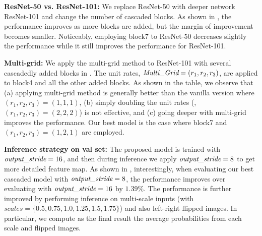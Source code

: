 \textbf{ResNet-50 vs. ResNet-101:} We replace ResNet-50 with deeper network ResNet-101 and change the number of cascaded blocks. As shown in , the performance improves as more blocks are added, but the margin of improvement becomes smaller. Noticeably, employing block7 to ResNet-50 decreases slightly the performance while it still improves the performance for ResNet-101.

\textbf{Multi-grid:} We apply the multi-grid method to ResNet-101 with several cascadedly added blocks in . The unit rates, $\emph{Multi\_Grid}=(r_1,r_2,r_3)$, are applied to block4 and all the other added blocks. As shown in the table, we observe that (a) applying multi-grid method is generally better than the vanilla version where $(r_1,r_2,r_3)=(1, 1, 1)$, (b) simply doubling the unit rates (\ie, $(r_1,r_2,r_3)=(2, 2, 2)$) is not effective, and (c) going deeper with multi-grid improves the performance. Our best model is the case where block7 and $(r_1,r_2,r_3)=(1,2,1)$ are employed. 

\textbf{Inference strategy on val set:} The proposed model is trained with $\emph{output\_stride}=16$, and then during inference we apply $\emph{output\_stride}=8$ to get more detailed feature map. As shown in , interestingly, when evaluating our best cascaded model with $\emph{output\_stride}=8$, the performance improves over evaluating with $\emph{output\_stride}=16$ by $1.39\%$. The performance is further improved by performing inference on multi-scale inputs (with $scales=\{0.5, 0.75, 1.0, 1.25, 1.5, 1.75\}$) and also left-right flipped images. In particular, we compute as the final result the average probabilities from each scale and flipped images.

\begin{table}[!t]
  \centering
  \caption{Inference strategy on the \textit{val} set. {\bf MG}: Multi-grid. {\bf OS}: \emph{output\_stride}. {\bf MS}: Multi-scale inputs during test. {\bf Flip}: Adding left-right flipped inputs.}
  \label{tab:deeper_val}
\end{table}

